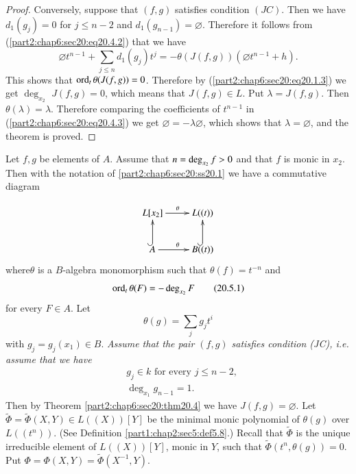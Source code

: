 \begin{proof}
Conversely, suppose that $(f, g)$ satisfies condition $(JC)$. Then we
have $d_1 (g_j)=0$ for $j \leq n-2$ and $d_1 (g_{n-1})=
\diameter$. Therefore it follows from
(\ref{part2:chap6:sec20:eq20.4.2}) that we have
\begin{equation*}
  \diameter t^{n-1}+ \sum_{j \leq n} d_1 (g_j)t^j=- \theta (J(f, g))
  (\diameter t^{n-1}+ h).\tag{20.4.3}\label{part2:chap6:sec20:eq20.4.3} 
\end{equation*}
This shows that $\operatorname{ord}_t \theta (J(f, g))=0$. Therefore by
(\ref{part2:chap6:sec20:eq20.1.3}) we get $\deg_{x_2}$ $J (f, g)=0$,
which means that $J(f, g)\in L$. Put $\lambda = J(f, g)$. Then $\theta
(\lambda)= \lambda$. Therefore comparing the coefficients of $t^{n-1}$
in (\ref{part2:chap6:sec20:eq20.4.3}) we get $\diameter =- \lambda
\diameter$, which shows that $\lambda = \diameter$, and the theorem is proved.
\end{proof}

\begin{notn}\label{part2:chap6:sec20:notn20.5}
  Let $f, g$ be elements of $A$. Assume that $n= \deg_{x_2}\break f > 0$ and
  that $f$ is monic in $x_2$. Then with the notation of
  \ref{part2:chap6:sec20:ss20.1} we have a commutative diagram

\[
\xymatrix{L[x_2] \ar[r]^\theta & L((t))\\
A \ar@{^{(}->}[u] \ar[r]^\theta & B((t))\ar@{^{(}->}[u]
}
\]  
where\pageoriginale $\theta$ is a $B$-algebra monomorphism such that
$\theta (f)= t^{-n}$ and 
\begin{equation*}
  \operatorname{ord}_{t}\theta (F) = - \deg_{x_2}F
  \tag{20.5.1} \label{part2:chap6:sec20:eq20.5.1} 
\end{equation*}
for every $F \in A$. Let
$$
\theta (g) = \sum_j g_j t^i
$$
with $g_j= g_j (x_1) \in B$. {\em Assume that the pair $(f, g)$ satisfies
condition (JC), i.e. assume that we have}
\begin{equation*}
\begin{aligned}
  & g_j \in k \text{ for every } j \leq n-2,\\
  & \deg_{x_1} g_{n-1}=1.
\end{aligned}\tag{20.5.2}\label{part2:chap6:sec20:eq20.5.2}
\end{equation*}
Then by Theorem \ref{part2:chap6:sec20:thm20.4} we have $J(f, g)=
\diameter$. Let $\tilde{\Phi}= \tilde{\Phi} (X, Y)\in L((X))[Y]$ be
the minimal monic polynomial of $\theta (g)$ over $L((t^n))$. (See
Definition \ref{part1:chap2:sec5:def5.8}.) Recall that $\tilde{\Phi}$
is the unique irreducible element of $L((X)) [Y]$, monic in $Y$, such
that $\tilde{\Phi} (t^n, \theta (g))=0$. Put $\Phi = \Phi (X, Y)= \tilde{\Phi}
(X^{-1}, Y)$.
\end{notn}

